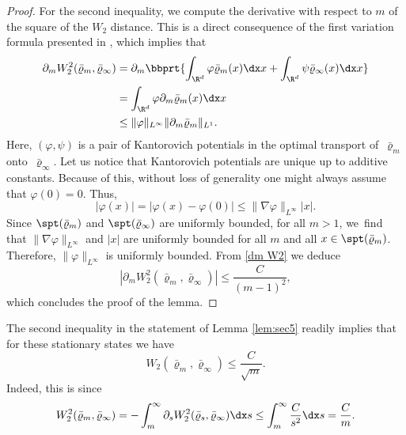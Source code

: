 \begin{proof}
{For the second inequality,} we compute the derivative with respect to $m$ of the square of the $W_{2}$ distance. This is a direct consequence of the first variation formula presented in \cite[Prop.\,7.17]{OTAM}, which implies that
\begin{equation}
\label{dm W2}
\begin{aligned}
\partial_m W_2^2(\bar\varrho_m, \bar\varrho_\infty) &= \partial_m \bbprt{\int_{\R^d} \varphi \bar\varrho_m(x) \dx x +\int_{\R^d} \psi \bar\varrho_\infty(x) \dx x }\\
&= \int_{\R^d} \varphi \partial_m \bar\varrho_m(x) \dx x\\
&\leq \|\varphi\|_{L^\infty} \|\partial_m \bar\varrho_m\|_{L^1}.
\end{aligned}
\end{equation}
Here, $(\varphi,\psi)$ is a pair of Kantorovich potentials in the optimal transport of~$\bar\varrho_m$ onto~$\bar\varrho_\infty$. Let us notice that Kantorovich potentials are unique up to additive constants. Because of this, without loss of generality one might always assume that $\varphi(0)=0$. Thus,
\[
|\varphi(x)|=|\varphi(x)-\varphi(0)|\le \|\nabla\varphi\|_{L^{\infty}}|x|.
\] Since $\spt(\bar\varrho_{m})$ and $\spt(\bar\varrho_{\infty})$ are uniformly bounded, for all $m>1$, we~find that $\|\nabla\varphi\|_{L^{\infty}}$ and $|x|$ are uniformly bounded for all $m$ and all $x\in\spt(\bar\varrho_{m})$. Therefore, $\|\varphi\|_{L^{\infty}}$ is uniformly bounded.
From \eqref{dm W2} we deduce
\begin{equation*}
\left| \partial_m W_2^2(\bar\varrho_m, \bar\varrho_\infty)\right| \leq \frac{C}{(m-1)^2},
\end{equation*}
which concludes the proof of the lemma.
\end{proof}

\begin{corollary}
The second inequality in the statement of Lemma \ref{lem:sec5} readily implies that for these stationary states we have
\begin{equation*}
W_2(\bar\varrho_m, \bar\varrho_\infty) \leq \frac{C}{\sqrt m}.
\end{equation*}
Indeed, this is since
\begin{align*}
W_2^{2}(\bar\varrho_m, \bar\varrho_\infty) = - \int_{m}^{\infty} \partial_{s} W_2^{2}(\bar\varrho_s, \bar\varrho_\infty)\dx s \le \int_{m}^{\infty} \frac{C}{s^{2}}\dx s = \frac{C}{m}.
\end{align*}
\end{corollary}

